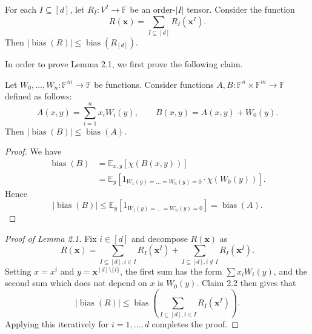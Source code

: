 \begin{lemma}[2.1]
For each $I\subseteq[d]$, let $R_I:V^I\to\mathbb F$ be an order-$|I|$ tensor. Consider the function
\[
R(\mathbf x)=\sum_{I\subseteq[d]}R_I(\mathbf x^I).
\]
Then $|\operatorname{bias}(R)|\leq\operatorname{bias}(R_{[d]})$.
\end{lemma}
In order to prove Lemma 2.1, we first prove the following claim.
\begin{proposition}[Claim 2.2]
Let $W_0,\ldots,W_n:\mathbb F^m\to\mathbb F$ be functions. Consider functions $A,B:\mathbb F^n\times\mathbb F^m\to\mathbb F$ defined as follows:
\[
A(x,y)=\sum_{i=1}^n x_iW_i(y),\qquad B(x,y)=A(x,y)+W_0(y).
\]
Then $|\operatorname{bias}(B)|\leq\operatorname{bias}(A)$.
\end{proposition}
\begin{proof}
We have
\begin{align*}
\operatorname{bias}(B)&=\mathbb E_{x,y}[\chi(B(x,y))]\\
&=\mathbb E_y[1_{W_1(y)=\ldots=W_n(y)=0}\cdot\chi(W_0(y))].
\end{align*}
Hence
\[
|\operatorname{bias}(B)|\leq\mathbb E_y[1_{W_1(y)=\ldots=W_n(y)=0}]=\operatorname{bias}(A).
\]
\end{proof}
\begin{proof}[Proof of Lemma 2.1]
Fix $i\in[d]$ and decompose $R(\mathbf x)$ as
\[
R(\mathbf x)=\sum_{I\subseteq[d],i\in I}R_I(\mathbf x^I)+\sum_{I\subseteq[d],i\notin I}R_I(\mathbf x^I).
\]
Setting $x=x^i$ and $y=\mathbf x^{[d]\setminus\{i\}}$, the first sum has the form $\sum x_iW_i(y)$, and the second sum which does not depend on $x$ is $W_0(y)$. Claim 2.2 then gives that
\[
|\operatorname{bias}(R)|\leq\operatorname{bias}\left(\sum_{I\subseteq[d],i\in I}R_I(\mathbf x^I)\right).
\]
Applying this iteratively for $i=1,\ldots,d$ completes the proof.
\end{proof}
